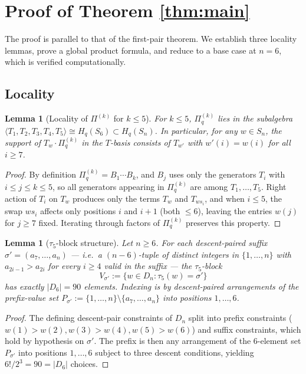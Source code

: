 \documentclass[11pt]{article}
\newtheorem{lemma}[theorem]{Lemma}
\theoremstyle{definition}
\begin{document}
\section{Proof of Theorem \ref{thm:main}}

The proof is parallel to that of the first-pair theorem. We establish three
locality lemmas, prove a global product formula, and reduce to a base case at
$n=6$, which is verified computationally.

\subsection{Locality}

\begin{lemma}[Locality of $\Pi^{(k)}$ for $k \leq 5$]
\label{lem:loc}
For $k \leq 5$, $\Pi^{(k)}_q$ lies in the subalgebra
$\langle T_1, T_2, T_3, T_4, T_5 \rangle \cong H_q(S_6) \subset H_q(S_n)$. In
particular, for any $w \in S_n$, the support of $T_w \cdot \Pi^{(k)}_q$ in the
$T$-basis consists of $T_{w'}$ with $w'(i) = w(i)$ for all $i \geq 7$.
\end{lemma}

\begin{proof}
By definition $\Pi^{(k)}_q = B_1 \cdots B_k$, and $B_j$ uses only the generators
$T_i$ with $i \leq j \leq k \leq 5$, so all generators appearing in
$\Pi^{(k)}_q$ are among $T_1, \ldots, T_5$. Right action of $T_i$ on $T_w$
produces only the terms $T_w$ and $T_{ws_i}$, and when $i \leq 5$, the swap
$ws_i$ affects only positions $i$ and $i+1$ (both $\leq 6$), leaving the
entries $w(j)$ for $j \geq 7$ fixed. Iterating through factors of $\Pi^{(k)}_q$
preserves this property.
\end{proof}

\begin{lemma}[$\tau_5$-block structure]
\label{lem:blocks}
Let $n \geq 6$. For each descent-paired suffix $\sigma' = (a_7, \ldots, a_n)$
--- i.e.\ a $(n-6)$-tuple of distinct integers in $\{1,\ldots,n\}$ with
$a_{2i-1} > a_{2i}$ for every $i \geq 4$ valid in the suffix --- the
$\tau_5$-block
\[
V_{\sigma'} := \{ w \in D_n : \tau_5(w) = \sigma' \}
\]
has exactly $|D_6| = 90$ elements. Indexing is by descent-paired arrangements of
the prefix-value set $P_{\sigma'} := \{1, \ldots, n\} \setminus \{a_7, \ldots, a_n\}$
into positions $1, \ldots, 6$.
\end{lemma}

\begin{proof}
The defining descent-pair constraints of $D_n$ split into prefix constraints
($w(1)>w(2), w(3)>w(4), w(5)>w(6)$) and suffix constraints, which hold by
hypothesis on $\sigma'$. The prefix is then any arrangement of the $6$-element
set $P_{\sigma'}$ into positions $1, \ldots, 6$ subject to three descent
conditions, yielding $6!/2^3 = 90 = |D_6|$ choices.
\end{proof}
\end{document}
